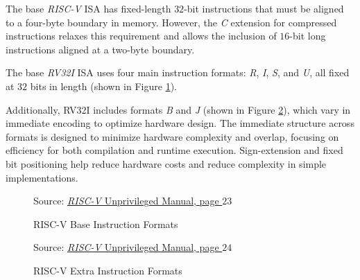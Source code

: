 The base \textit{RISC-V} ISA has fixed-length $32$-bit instructions that must be
aligned to a four-byte boundary in memory. However, the \textit{C} extension for
compressed instructions relaxes this requirement and allows the inclusion of
$16$-bit long instructions aligned at a two-byte boundary.

The base \textit{RV32I} ISA uses four main instruction formats: \textit{R},
\textit{I}, \textit{S}, and \textit{U}, all fixed at $32$ bits in length (shown in
Figure \ref{fig:instrformats}).

Additionally, RV32I includes formats \textit{B} and \textit{J} (shown in Figure
\ref{fig:extrainstrformats}), which vary in immediate encoding to optimize
hardware design. The immediate structure across formats is designed to minimize hardware
complexity and overlap, focusing on efficiency for both compilation and runtime
execution. Sign-extension and fixed bit positioning help reduce hardware costs and
reduce complexity in simple implementations.
\begin{figure}[htbp]
  \centering
  \def\stackalignment{r}
  {\scriptsize Source: \href{https://drive.google.com/file/d/1uviu1nH-tScFfgrovvFCrj7Omv8tFtkp/view}{\textit{RISC-V} Unprivileged Manual, page $23$}}
  \caption{RISC-V Base Instruction Formats}
  \label{fig:instrformats}
\end{figure}

\begin{figure}[htbp]
  \centering
  \def\stackalignment{r} %
  {\scriptsize Source: \href{https://drive.google.com/file/d/1uviu1nH-tScFfgrovvFCrj7Omv8tFtkp/view}{\textit{RISC-V} Unprivileged Manual, page $24$}}
  \caption{RISC-V Extra Instruction Formats}
  \label{fig:extrainstrformats}
\end{figure}

